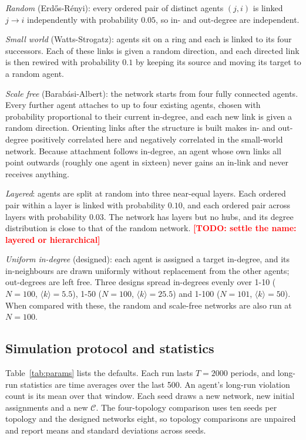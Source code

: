 \documentclass[11pt]{article}
\newcommand{\todo}[1]{\textcolor{red}{\textbf{[TODO: #1]}}}
\begin{document}
\emph{Random} (Erd\H{o}s-R\'enyi): every ordered pair of distinct agents $(j, i)$ is linked $j \to i$ independently with probability $0.05$, so in- and out-degree are independent.

\emph{Small world} (Watts-Strogatz): agents sit on a ring and each is linked to its four successors. Each of these links is given a random direction, and each directed link is then rewired with probability $0.1$ by keeping its source and moving its target to a random agent.

\emph{Scale free} (Barab\'asi-Albert): the network starts from four fully connected agents. Every further agent attaches to up to four existing agents, chosen with probability proportional to their current in-degree, and each new link is given a random direction. Orienting links after the structure is built makes in- and out-degree positively correlated here and negatively correlated in the small-world network. Because attachment follows in-degree, an agent whose own links all point outwards (roughly one agent in sixteen) never gains an in-link and never receives anything.

\emph{Layered}: agents are split at random into three near-equal layers. Each ordered pair within a layer is linked with probability $0.10$, and each ordered pair across layers with probability $0.03$. The network has layers but no hubs, and its degree distribution is close to that of the random network. \todo{settle the name: layered or hierarchical}

\emph{Uniform in-degree} (designed): each agent is assigned a target in-degree, and its in-neighbours are drawn uniformly without replacement from the other agents; out-degrees are left free. Three designs spread in-degrees evenly over 1-10 ($N = 100$, $\langle k\rangle = 5.5$), 1-50 ($N = 100$, $\langle k\rangle = 25.5$) and 1-100 ($N = 101$, $\langle k\rangle = 50$). When compared with these, the random and scale-free networks are also run at $N = 100$.

\subsection{Simulation protocol and statistics}

Table~\ref{tab:params} lists the defaults. Each run lasts $T = 2000$ periods, and long-run statistics are time averages over the last 500. An agent's long-run violation count is its mean over that window. Each seed draws a new network, new initial assignments and a new $\mathcal{C}$. The four-topology comparison uses ten seeds per topology and the designed networks eight, so topology comparisons are unpaired and report means and standard deviations across seeds.
\end{document}
